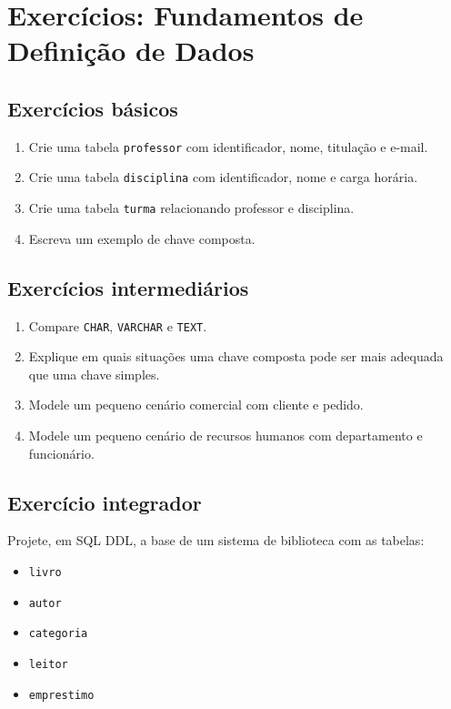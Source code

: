 \section{Exercícios: Fundamentos de Definição de Dados}
\subsection{Exercícios básicos}

\begin{enumerate}
    \item Crie uma tabela \texttt{professor} com identificador, nome, titulação e e-mail.
    \item Crie uma tabela \texttt{disciplina} com identificador, nome e carga horária.
    \item Crie uma tabela \texttt{turma} relacionando professor e disciplina.
    \item Escreva um exemplo de chave composta.
\end{enumerate}

\subsection{Exercícios intermediários}

\begin{enumerate}
    \item Compare \texttt{CHAR}, \texttt{VARCHAR} e \texttt{TEXT}.
    \item Explique em quais situações uma chave composta pode ser mais adequada que uma chave simples.
    \item Modele um pequeno cenário comercial com cliente e pedido.
    \item Modele um pequeno cenário de recursos humanos com departamento e funcionário.
\end{enumerate}

\subsection{Exercício integrador}

Projete, em SQL DDL, a base de um sistema de biblioteca com as tabelas:
\begin{itemize}
    \item \texttt{livro}
    \item \texttt{autor}
    \item \texttt{categoria}
    \item \texttt{leitor}
    \item \texttt{emprestimo}
\end{itemize}

